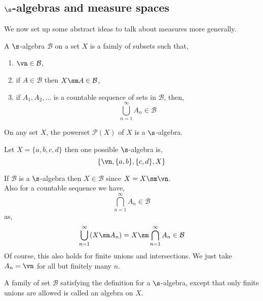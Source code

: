 \subsection{$\s$-algebras and measure spaces}
We now set up some abstract ideas to talk about measures more generally.
\begin{ndefi}[$\s$-algebra]
  A $\s$-algebra $\mathcal{B}$ on a set $X$ is a faimly of subsets such that,
  \begin{enumerate}
    \item $\vn \in \mathcal{B}$,
    \item if $A \in \mathcal{B}$ then $X\sm A \in \mathcal{B}$,
    \item if $A_1, A_2, \dots$ is a countable sequence of sets in $\mathcal{B}$, then,
    $$ \bigcup_{n=1}^\infty A_n \in \mathcal{B} $$
  \end{enumerate}
\end{ndefi}

\begin{eg}
  On any set $X$, the powerset $\mathcal{P}(X)$ of $X$ is a $\s$-algebra.
\end{eg}

\begin{eg}
  Let $X = \{a, b, c, d\}$ then one possible $\s$-algebra is,
  $$ \{\vn, \{a, b\}, \{c, d\}, X\} $$
\end{eg}

\begin{remark}
   If $\mathcal{B}$ is a $\s$-algebra then $X \in \mathcal{B}$ since $X = X\sm \vn$.\\

   \noindent
   Also for a countable sequence we have,
   $$ \bigcap_{n=1}^\infty A_n \in \mathcal{B} $$
   as,
   $$ \bigcup_{n=1}^\infty (X \sm A_n) = X \sm \bigcap_{n=1}^\infty A_n  \in \mathcal{B}$$
   \noindent
   Of course, this also holds for finite unions and intersections. We just take $A_n = \vn$ for all but finitely many $n$.
\end{remark}

\begin{remark}
   A family of set $\mathcal{B}$ satisfying the definition for a $\s$-algebra, except that only finite unions are allowed is called an algebra on $X$.
\end{remark}

